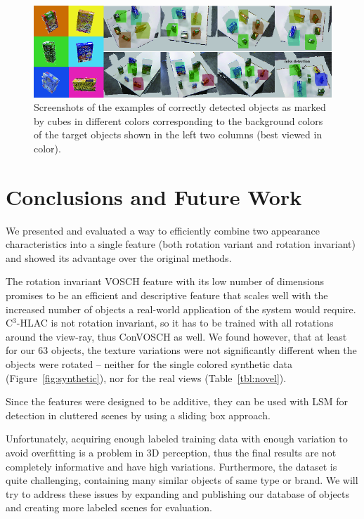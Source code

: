 \documentclass[letterpaper, 10 pt, conference]{sty/ieeeconf}
\begin{document}
\begin{figure}[tb!]
  \centering
  \includegraphics[width=.99\textwidth]{figures/detection_demo/four_objects_detection.png}
  \caption{Screenshots of the examples of correctly detected objects as marked by cubes in different colors corresponding to the background colors of the target objects shown in the left two columns (best viewed in color). }
  \label{fig:correct_detected}
\end{figure}



\section{Conclusions and Future Work}
\label{sec:conclusion}

We presented and evaluated a way to efficiently combine two
appearance characteristics into a single feature (both rotation
variant and rotation invariant) and showed its advantage over
the original methods.

The rotation invariant VOSCH feature with its low number of dimensions
promises to be an efficient and descriptive feature that scales well with
the increased number of objects a real-world application of the system would
require. C$^3$-HLAC is not rotation invariant, so it has to be trained with
all rotations around the view-ray, thus ConVOSCH as well. We found
however, that at least for our 63 objects, the texture variations
were not significantly different when the objects were rotated
-- neither for the single colored synthetic data (Figure~\ref{fig:synthetic}),
nor for the real views (Table~\ref{tbl:novel}).

Since the features were designed to be additive, they can be used with LSM for
detection in cluttered scenes by using a sliding box approach.

Unfortunately, acquiring enough labeled training data with enough variation
to avoid overfitting is a problem in 3D perception, thus the final results are
not completely informative and have high variations.
Furthermore, the dataset is quite challenging, containing many similar objects of same type or brand.
We will try to address these issues by expanding and publishing our database of objects
and creating more labeled scenes for evaluation.
\end{document}
